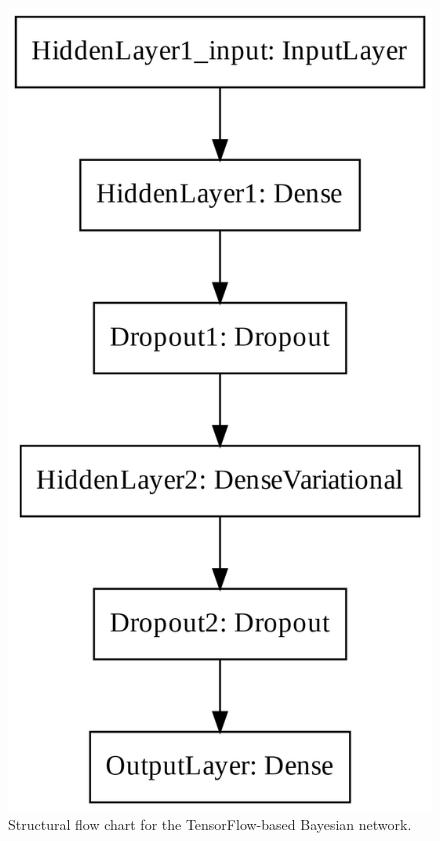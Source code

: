 \begin{figure}[!htp]
\centering
\begin{minipage}[b][][b]{.35\linewidth}
    \includegraphics[width=\linewidth]{templates/images/Figure-TF_BNN_Structure.png}
    \caption[Bayesian neural network structural flow]{Structural flow chart for the TensorFlow-based Bayesian network.}
    \label{fig:bnn_text_structure}

\end{minipage}
\end{figure}
